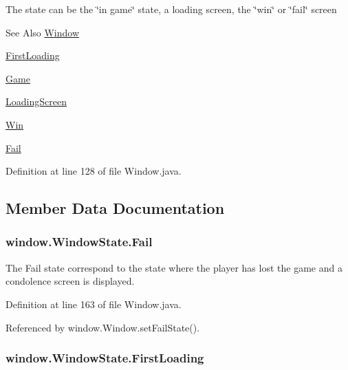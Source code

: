 The state can be the \char`\"{}in game\char`\"{} state, a loading screen, the \char`\"{}win\char`\"{} or \char`\"{}fail\char`\"{} screen \begin{DoxySeeAlso}{See Also}
\hyperlink{classwindow_1_1_window}{Window} 

\hyperlink{enumwindow_1_1_window_state_a56269b4774b71a1dcba9e5e9cefb495e}{First\-Loading} 

\hyperlink{enumwindow_1_1_window_state_abb4a2512f88d7104f91993174488282d}{Game} 

\hyperlink{enumwindow_1_1_window_state_a281f52964a4be64ea19bf2a401184521}{Loading\-Screen} 

\hyperlink{enumwindow_1_1_window_state_adfd70a04c81f1ff3b289d5b766206fb5}{Win} 

\hyperlink{enumwindow_1_1_window_state_ace96026e75eb5118b66e8703fd93d68c}{Fail} 
\end{DoxySeeAlso}


Definition at line 128 of file Window.\-java.



\subsection{Member Data Documentation}
\hypertarget{enumwindow_1_1_window_state_ace96026e75eb5118b66e8703fd93d68c}{
\subsubsection[{Fail}]{\setlength{\rightskip}{0pt plus 5cm}window.\-Window\-State.\-Fail}}\label{enumwindow_1_1_window_state_ace96026e75eb5118b66e8703fd93d68c}


The Fail state correspond to the state where the player has lost the game and a condolence screen is displayed. 



Definition at line 163 of file Window.\-java.



Referenced by window.\-Window.\-set\-Fail\-State().

\hypertarget{enumwindow_1_1_window_state_a56269b4774b71a1dcba9e5e9cefb495e}{
\subsubsection[{First\-Loading}]{\setlength{\rightskip}{0pt plus 5cm}window.\-Window\-State.\-First\-Loading}}\label{enumwindow_1_1_window_state_a56269b4774b71a1dcba9e5e9cefb495e}


